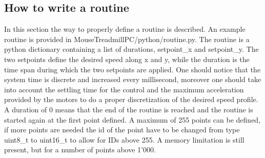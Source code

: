 \documentclass[12pt,a4paper]{article}
\begin{document}
\subsection{How to write a routine}
In this section the way to properly define a routine is described. 
An example routine is provided in MouseTreadmillPC/python/routine.py. The routine is a python dictionary containing a list of durations, setpoint\_x and setpoint\_y. The two setpoints define the desired speed along x and y, while the duration is the time span during which the two setpoints are applied. One should notice that the system time is discrete and increased every millisecond, moreover one should take into account the settling time for the control and the maximum acceleration provided by the motors to do a proper discretization of the desired speed profile.\\
A duration of 0 means that the end of the routine is reached and the routine is started again at the first point defined. A maximum of 255 points can be defined, if more points are needed the id of the point have to be changed from type uint8\_t to uint16\_t to allow for IDs above 255. A memory limitation is still present, but for a number of points above 1'000.
\end{document}
